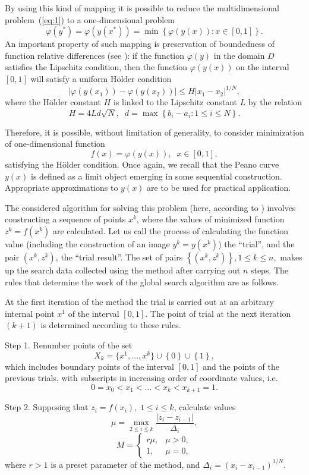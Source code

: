 \documentclass[smallcondensed]{svjour3}     %
\begin{document}
By using this kind of mapping it is possible to reduce the multidimensional problem~(\ref{eq:1}) to a one-dimensional problem
\[
\varphi(y^\ast)=\varphi(y(x^\ast))=\min{\left\{\varphi(y(x)): x\in[0,1]\right\}}.
\]
An important property of such mapping is preservation of boundedness of function relative differences  (see \cite{RefStrongin2000}): if the function $\varphi(y)$ in the domain $D$ satisfies the Lipschitz condition, then the function $\varphi(y(x))$ on the interval $[0,1]$ will satisfy a uniform H{\"o}lder condition
\[
\left|\varphi(y(x_1))-\varphi(y(x_2))\right|\leq H\left|x_1-x_2\right|^{1/N},
\]
where the H{\"o}lder constant $H$ is linked to the Lipschitz constant $L$ by the relation
\[
H=4Ld\sqrt{N},\;\; d=\max{\left\{b_i-a_i:1\leq i \leq N\right\}}.
\]

Therefore, it is possible, without limitation of generality, to consider minimization of one-dimensional function
\[
f(x)=\varphi(y(x)), \;\; x\in[0,1],
\]
satisfying the H{\"o}lder condition.
Once again, we recall that the Peano curve $y(x)$ is defined as a limit object emerging in some sequential construction. Appropriate approximations to $y(x)$ are to be used for practical application.

The considered algorithm for solving this problem (here, according to \cite{RefStrongin2000}) involves constructing a sequence of points $x^k$, where the values of minimized function $z^k = f(x^k)$ are calculated. Let us call the process of calculating the function value (including the construction of an image $y^k=y(x^k)$) the ``trial'', and the pair $(x^k, z^k)$, the ``trial result''. The set of pairs $\left\{(x^k, z^k)\right\}, 1\leq k\leq n,$ makes up the search data collected using the method after carrying out $n$ steps. The rules that determine the work of the global search algorithm are as follows.

At the first iteration of the method the trial is carried out at an arbitrary internal point $x^1$ of the interval $[0,1]$. The point of trial at the next iteration $(k+1)$ is determined according to these rules.

Step 1. Renumber points of the set
\[
X_k=\{x^1,\dots,x^k\}\cup\left\{0\right\}\cup\left\{1\right\},
\]
which includes boundary points of the interval $[0,1]$ and the points of the previous trials, with subscripts in increasing order of coordinate values, i.e.
\[
0=x_0<x_1<\dots <x_k<x_{k+1}=1.
\]

Step 2. Supposing that  $z_i=f(x_i), \; 1\leq i \leq k$, calculate values 
\begin{equation}\label{eq:11}
\mu = \max_{2\leq i \leq k}\frac{\left|z_i-z_{i-1}\right|}{\Delta_i},
\end{equation}
\[
M = \left\{
   \begin{array}{lr}
     r\mu, & \mu > 0,\\
     1, & \mu = 0,
   \end{array}
\right.
 \]
where $r>1$ is a preset parameter of the method, and $\Delta_i=\left(x_i-x_{i-1}\right)^{1/N}$.
\end{document}
